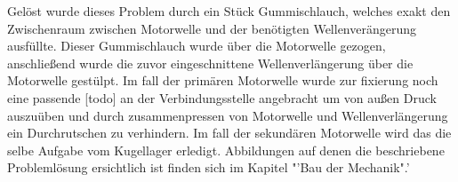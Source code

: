 \begin{itemize}
Gelöst wurde dieses Problem durch ein Stück Gummischlauch, welches exakt den Zwischenraum zwischen Motorwelle und der benötigten Wellenverängerung ausfüllte. Dieser Gummischlauch wurde über die Motorwelle gezogen, anschließend wurde die zuvor eingeschnittene Wellenverlängerung über die Motorwelle gestülpt. Im fall der primären Motorwelle wurde zur fixierung noch eine passende [todo] an der Verbindungsstelle angebracht um von außen Druck auszuüben und durch zusammenpressen von Motorwelle und Wellenverlängerung ein Durchrutschen zu verhindern. Im fall der sekundären Motorwelle wird das die selbe Aufgabe vom Kugellager erledigt. Abbildungen auf denen die beschriebene Problemlösung ersichtlich ist finden sich im Kapitel "'Bau der Mechanik".'
\end{itemize}
